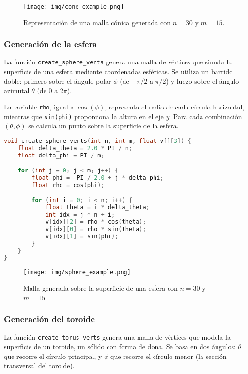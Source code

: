 \documentclass[12pt]{article}
\begin{document}
    \begin{figure}[H]
        \centering
        \texttt{[image: img/cone\_example.png]}
        \caption{Representación de una malla cónica generada con $n = 30$ y $m = 15$.}
    \end{figure}


    \subsubsection{Generación de la esfera}

    La función \texttt{create\_sphere\_verts} genera una malla de vértices que simula la superficie de una esfera mediante coordenadas esféricas. Se utiliza un barrido doble: primero sobre el ángulo polar $\phi$ (de $-\pi/2$ a $\pi/2$) y luego sobre el ángulo azimutal $\theta$ (de $0$ a $2\pi$).

    La variable \texttt{rho}, igual a $\cos(\phi)$, representa el radio de cada círculo horizontal, mientras que \texttt{sin(phi)} proporciona la altura en el eje $y$. Para cada combinación $(\theta, \phi)$ se calcula un punto sobre la superficie de la esfera.

    \begin{lstlisting}[language=C, caption={Generación de vértices para una esfera}]
void create_sphere_verts(int n, int m, float v[][3]) {
    float delta_theta = 2.0 * PI / n;
    float delta_phi = PI / m;

    for (int j = 0; j < m; j++) {
        float phi = -PI / 2.0 + j * delta_phi;
        float rho = cos(phi);

        for (int i = 0; i < n; i++) {
            float theta = i * delta_theta;
            int idx = j * n + i;
            v[idx][2] = rho * cos(theta);
            v[idx][0] = rho * sin(theta);
            v[idx][1] = sin(phi);
        }
    }
}
    \end{lstlisting}

    \begin{figure}[H]
        \centering
        \texttt{[image: img/sphere\_example.png]}
        \caption{Malla generada sobre la superficie de una esfera con $n = 30$ y $m = 15$.}
    \end{figure}


    \subsubsection{Generación del toroide}

    La función \texttt{create\_torus\_verts} genera una malla de vértices que modela la superficie de un toroide, un sólido con forma de dona. Se basa en dos ángulos: $\theta$ que recorre el círculo principal, y $\phi$ que recorre el círculo menor (la sección transversal del toroide).
\end{document}

